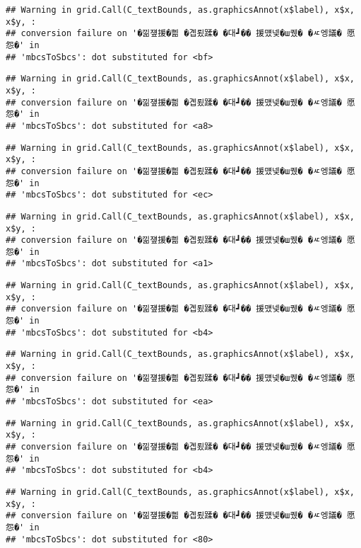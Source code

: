 \documentclass[
]{article}
\begin{document}
\begin{verbatim}
## Warning in grid.Call(C_textBounds, as.graphicsAnnot(x$label), x$x, x$y, :
## conversion failure on '�낆쟾援�쁾 �곕룄蹂� �대┛�� 援먰넻�ш퀬� �ㅼ엥議� 愿怨�' in
## 'mbcsToSbcs': dot substituted for <bf>
\end{verbatim}

\begin{verbatim}
## Warning in grid.Call(C_textBounds, as.graphicsAnnot(x$label), x$x, x$y, :
## conversion failure on '�낆쟾援�쁾 �곕룄蹂� �대┛�� 援먰넻�ш퀬� �ㅼ엥議� 愿怨�' in
## 'mbcsToSbcs': dot substituted for <a8>
\end{verbatim}

\begin{verbatim}
## Warning in grid.Call(C_textBounds, as.graphicsAnnot(x$label), x$x, x$y, :
## conversion failure on '�낆쟾援�쁾 �곕룄蹂� �대┛�� 援먰넻�ш퀬� �ㅼ엥議� 愿怨�' in
## 'mbcsToSbcs': dot substituted for <ec>
\end{verbatim}

\begin{verbatim}
## Warning in grid.Call(C_textBounds, as.graphicsAnnot(x$label), x$x, x$y, :
## conversion failure on '�낆쟾援�쁾 �곕룄蹂� �대┛�� 援먰넻�ш퀬� �ㅼ엥議� 愿怨�' in
## 'mbcsToSbcs': dot substituted for <a1>
\end{verbatim}

\begin{verbatim}
## Warning in grid.Call(C_textBounds, as.graphicsAnnot(x$label), x$x, x$y, :
## conversion failure on '�낆쟾援�쁾 �곕룄蹂� �대┛�� 援먰넻�ш퀬� �ㅼ엥議� 愿怨�' in
## 'mbcsToSbcs': dot substituted for <b4>
\end{verbatim}

\begin{verbatim}
## Warning in grid.Call(C_textBounds, as.graphicsAnnot(x$label), x$x, x$y, :
## conversion failure on '�낆쟾援�쁾 �곕룄蹂� �대┛�� 援먰넻�ш퀬� �ㅼ엥議� 愿怨�' in
## 'mbcsToSbcs': dot substituted for <ea>
\end{verbatim}

\begin{verbatim}
## Warning in grid.Call(C_textBounds, as.graphicsAnnot(x$label), x$x, x$y, :
## conversion failure on '�낆쟾援�쁾 �곕룄蹂� �대┛�� 援먰넻�ш퀬� �ㅼ엥議� 愿怨�' in
## 'mbcsToSbcs': dot substituted for <b4>
\end{verbatim}

\begin{verbatim}
## Warning in grid.Call(C_textBounds, as.graphicsAnnot(x$label), x$x, x$y, :
## conversion failure on '�낆쟾援�쁾 �곕룄蹂� �대┛�� 援먰넻�ш퀬� �ㅼ엥議� 愿怨�' in
## 'mbcsToSbcs': dot substituted for <80>
\end{verbatim}
\end{document}
